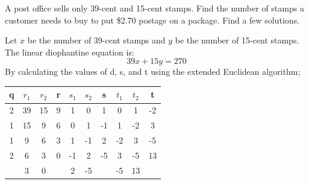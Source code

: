\documentclass[a4paper]{exam}
\begin{document}
\begin{questions}
        \question[10]
        A post office sells only 39-cent and 15-cent stamps. Find the number of stamps a customer needs to buy to put \$2.70 postage on a package. Find a few solutions.

        \begin{solution}
            Let $x$ be the number of 39-cent stamps and $y$ be the number of 15-cent stamps. The linear diophantine equation is:
            \[
                39x + 15y = 270
            \]
            By calculating the values of d, s, and t using the extended Euclidean algorithm;
            \begin{table}[H]
                \begin{center}
                    \begin{tabular}{|c|c|c|c|c|c|c|c|c|c|}
                    \hline
                    \textbf{q}               & \textbf{$r_1$} & \textbf{$r_2$} & \textbf{r}               & \textbf{$s_1$} & \textbf{$s_2$} & \textbf{s}               & \textbf{$t_1$} & \textbf{$t_2$} & \textbf{t}                                      \\ \hline
                    2                        & 39             & 15             & 9                        & 1                & 0              & 1                        & 0              & 1              & -2                                              \\ \hline
                    1                        & 15             & 9              & 6                        & 0                & 1              & -1                       & 1              & -2             & 3                                               \\ \hline
                    1                        & 9              & 6              & 3                        & 1                & -1             & 2                        & -2             & 3              & -5                                              \\ \hline
                    2                        & 6              & 3              & 0                        & -1               & 2              & -5                       & 3              & -5             & 13                                              \\ \hline
                                             & 3              & 0              &                          & 2                & -5             &                          & -5             & 13             &                                                 \\ \hline

\end{tabular}
\end{center}
\end{table}
\end{solution}
\end{questions}
\end{document}
